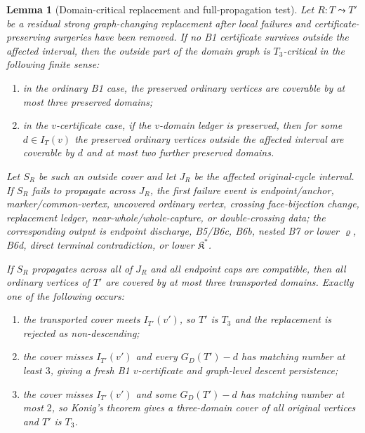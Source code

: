 \documentclass[11pt]{amsart}
\newtheorem{lemma}[theorem]{Lemma}
\theoremstyle{definition}
\begin{document}
\begin{lemma}[Domain-critical replacement and full-propagation test]
Let \(R:T\leadsto T'\) be a residual strong graph-changing replacement after local failures and certificate-preserving surgeries have been removed. If no B1 certificate survives outside the affected interval, then the outside part of the domain graph is \(T_3\)-critical in the following finite sense:

\begin{enumerate}
\item in the ordinary B1 case, the preserved ordinary vertices are coverable by at most three preserved domains;
\item in the \(v\)-certificate case, if the \(v\)-domain ledger is preserved, then for some \(d\in I_T(v)\) the preserved ordinary vertices outside the affected interval are coverable by \(d\) and at most two further preserved domains.
\end{enumerate}

Let \(S_R\) be such an outside cover and let \(J_R\) be the affected original-cycle interval. If \(S_R\) fails to propagate across \(J_R\), the first failure event is endpoint/anchor, marker/common-vertex, uncovered ordinary vertex, crossing face-bijection change, replacement ledger, near-whole/whole-capture, or double-crossing data; the corresponding output is endpoint discharge, B5/B6c, B6b, nested B7 or lower \(\varrho\), B6d, direct terminal contradiction, or lower \(\mathfrak K^\ast\).

If \(S_R\) propagates across all of \(J_R\) and all endpoint caps are compatible, then all ordinary vertices of \(T'\) are covered by at most three transported domains. Exactly one of the following occurs:

\begin{enumerate}
\item the transported cover meets \(I_{T'}(v')\), so \(T'\) is \(T_3\) and the replacement is rejected as non-descending;
\item the cover misses \(I_{T'}(v')\) and every \(G_D(T')-d\) has matching number at least \(3\), giving a fresh B1 \(v\)-certificate and graph-level descent persistence;
\item the cover misses \(I_{T'}(v')\) and some \(G_D(T')-d\) has matching number at most \(2\), so Konig's theorem gives a three-domain cover of all original vertices and \(T'\) is \(T_3\).
\end{enumerate}

\end{lemma}
\end{document}
